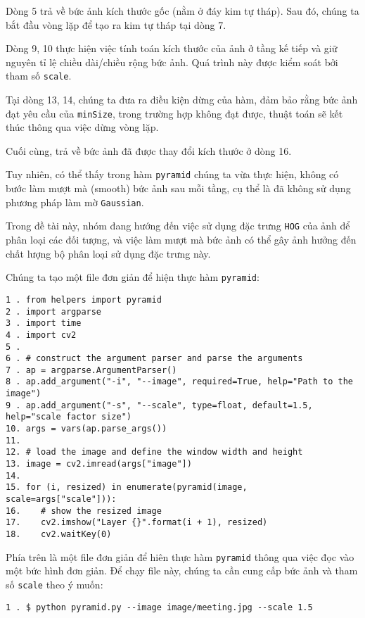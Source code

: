 \documentclass[12pt,a4paper]{article}
\begin{document}
Dòng 5 trả về bức ảnh kích thước gốc (nằm ở đáy kim tự tháp). Sau đó, chúng ta bắt đầu vòng lặp để tạo ra kim tự tháp tại dòng 7.

Dòng 9, 10 thực hiện việc tính toán kích thước của ảnh ở tầng kế tiếp và giữ nguyên tỉ lệ chiều dài/chiều rộng bức ảnh. Quá trình này được kiểm soát bởi tham số \verb|scale|.

Tại dòng 13, 14, chúng ta đưa ra điều kiện dừng của hàm, đảm bảo rằng bức ảnh đạt yêu cầu của \verb|minSize|, trong trường hợp không đạt được, thuật toán sẽ kết thúc thông qua việc dừng vòng lặp.

Cuối cùng, trả về bức ảnh đã được thay đổi kích thước ở dòng 16.

Tuy nhiên, có thể thấy trong hàm \verb|pyramid| chúng ta vừa thực hiện, không có bước làm mượt mà (smooth) bức ảnh sau mỗi tầng, cụ thể là đã không sử dụng phương pháp làm mờ \verb|Gaussian|.

Trong đề tài này, nhóm đang hướng đến việc sử dụng đặc trưng \verb|HOG| của ảnh để phân loại các đối tượng, và việc làm mượt mà bức ảnh có thể gây ảnh hưởng đến chất lượng bộ phân loại sử dụng đặc trưng này. \cite{smooth}

Chúng ta tạo một file đơn giản để hiện thực hàm \verb|pyramid|:

\begin{lstlisting}
1 . from helpers import pyramid
2 . import argparse
3 . import time
4 . import cv2
5 .
6 . # construct the argument parser and parse the arguments
7 . ap = argparse.ArgumentParser()
8 . ap.add_argument("-i", "--image", required=True, help="Path to the image")
9 . ap.add_argument("-s", "--scale", type=float, default=1.5, help="scale factor size")
10. args = vars(ap.parse_args())
11.
12. # load the image and define the window width and height
13. image = cv2.imread(args["image"])
14.
15. for (i, resized) in enumerate(pyramid(image, scale=args["scale"])):
16.    # show the resized image
17.    cv2.imshow("Layer {}".format(i + 1), resized)
18.    cv2.waitKey(0)

\end{lstlisting}

Phía trên là một file đơn giản để hiên thực hàm \verb|pyramid| thông qua việc đọc vào một bức hình đơn giản. Để chạy file này, chúng ta cần cung cấp bức ảnh và tham số \verb|scale| theo ý muốn:

\begin{lstlisting}
1 . $ python pyramid.py --image image/meeting.jpg --scale 1.5
\end{lstlisting}
\end{document}
